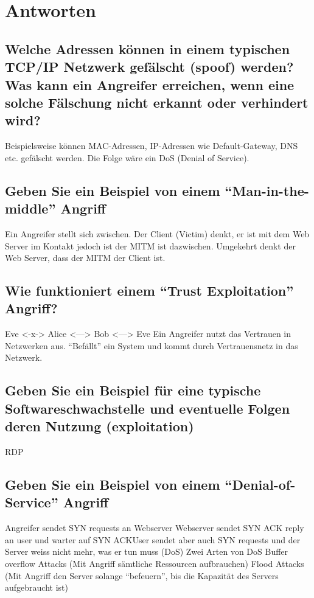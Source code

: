 \section{Antworten}
\subsection*{Welche Adressen können in einem typischen TCP/IP Netzwerk gefälscht (spoof) werden? Was kann ein Angreifer erreichen, wenn eine solche Fälschung nicht erkannt oder verhindert wird?}
Beispielsweise können MAC-Adressen, IP-Adressen wie Default-Gateway, DNS etc. gefälscht werden. Die Folge wäre ein DoS (Denial of Service).

\subsection*{Geben Sie ein Beispiel von einem "`Man-in-the-middle"' Angriff}
Ein Angreifer stellt sich zwischen. Der Client (Victim) denkt, er ist mit dem Web Server im Kontakt jedoch ist der MITM ist dazwischen. Umgekehrt denkt der Web Server, dass der MITM der Client ist.

\subsection*{Wie funktioniert einem "`Trust Exploitation"' Angriff?}
Eve <-x-> Alice <---> Bob <---> Eve
Ein Angreifer nutzt das Vertrauen in Netzwerken aus. "`Befällt"' ein System und kommt durch Vertrauensnetz in das Netzwerk.

\subsection*{Geben Sie ein Beispiel für eine typische Softwareschwachstelle und eventuelle Folgen deren Nutzung (exploitation)}
RDP

\subsection*{Geben Sie ein Beispiel von einem "`Denial-of-Service"' Angriff}
Angreifer sendet SYN requests an Webserver
Webserver sendet SYN ACK reply an user und warter auf SYN ACKUser sendet aber auch SYN requests und der Server weiss nicht mehr, was er tun muss (DoS)
Zwei Arten von DoS
Buffer overflow Attacks (Mit Angriff sämtliche Ressourcen aufbrauchen)
Flood Attacks (Mit Angriff den Server solange "`befeuern"', bis die Kapazität des Servers aufgebraucht ist)

